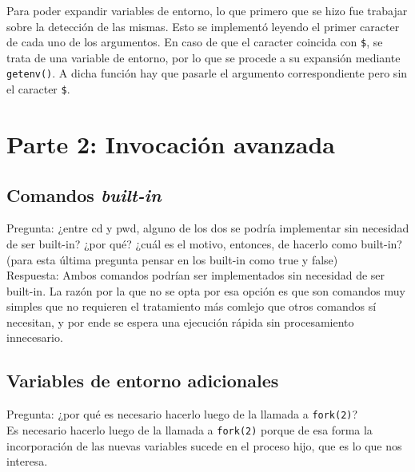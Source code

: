 \documentclass{article}
\begin{document}
Para poder expandir variables de entorno, lo que primero que se hizo fue trabajar sobre la detección de las mismas. Esto se implementó leyendo el primer caracter de cada uno de los argumentos. En caso de que el caracter coincida con \texttt{\$}, se trata de una variable de entorno, por lo que se procede a su expansión mediante \texttt{getenv()}. A dicha función hay que pasarle el argumento correspondiente pero sin el caracter \texttt{\$}.




\newpage
\section{Parte 2: Invocación avanzada}
\subsection{Comandos \textit{built-in}}
Pregunta: ¿entre cd y pwd, alguno de los dos se podría implementar sin necesidad de ser built-in? ¿por qué? ¿cuál es el motivo, entonces, de hacerlo como built-in? (para esta última pregunta pensar en los built-in como true y false)\\

Respuesta: Ambos comandos podrían ser implementados sin necesidad de ser built-in. La razón por la que no se opta por esa opción es que son comandos muy simples que no requieren el tratamiento más comlejo que otros comandos sí necesitan, y por ende se espera una ejecución rápida sin procesamiento innecesario. 


\subsection{Variables de entorno adicionales}
Pregunta: ¿por qué es necesario hacerlo luego de la llamada a \texttt{fork(2)}?\\

Es necesario hacerlo luego de la llamada a \texttt{fork(2)} porque de esa forma la incorporación de las nuevas variables sucede en el proceso hijo, que es lo que nos interesa.\\
\end{document}

